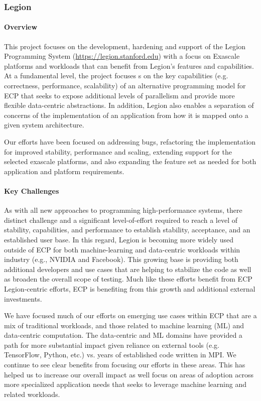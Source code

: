 \subsubsection{ Legion}

\paragraph{Overview}
This project focuses on the development, hardening and support of the
Legion Programming System (\url{https://legion.stanford.edu}) with a
focus on Exascale platforms and workloads that can benefit from
Legion's features and capabilities.  At a fundamental level, the
project focuses s on the key capabilities (e.g. correctness,
performance, scalability) of an alternative programming model for ECP
that seeks to expose additional levels of parallelism and provide more
flexible data-centric abstractions.  In addition, Legion also enables
a separation of concerns of the implementation of an application from
how it is mapped onto a given system architecture.

Our efforts have been focused on addressing bugs, refactoring the
implementation for improved stability, performance and scaling,
extending support for the selected exascale platforms, and also
expanding the feature set as needed for both application and
platform requirements.

\paragraph{Key Challenges}
As with all new approaches to programming high-performance systems,
there distinct challenge and a significant level-of-effort required to
reach a level of stability, capabilities, and performance to establish
stability, acceptance, and an established user base.  In this
regard, Legion is becoming more widely used outside of ECP for both
machine-learning and data-centric workloads within industry (e.g.,
NVIDIA and Facebook).  This growing base is providing both additional
developers and use cases that are helping to stabilize the code as
well as broaden the overall scope of testing.  Much like these efforts
benefit from ECP Legion-centric efforts, ECP is benefiting from this
growth and additional external investments.

We have focused much of our efforts on emerging use cases within ECP
that are a mix of traditional workloads, and those related to machine
learning (ML) and data-centric computation.  The data-centric and ML
domains have provided a path for more substantial impact given reliance
on external tools (e.g. TensorFlow, Python, etc.) vs. years of established code
written in MPI.  We continue to see clear benefits from focusing our efforts in
these areas. This has helped us to increase our overall impact as well focus on
areas of adoption across more specialized application needs that seeks to leverage
machine learning and related workloads.

